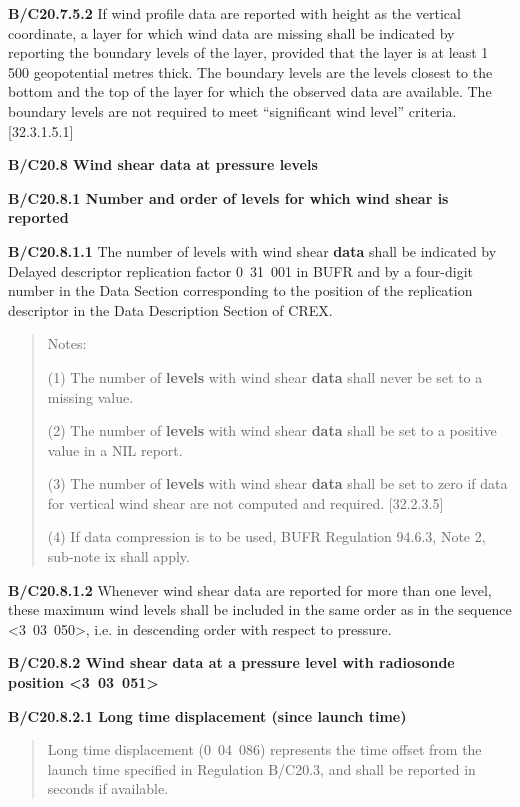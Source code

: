 \textbf{B/C20.7.5.2} If wind profile data are reported with height as the vertical coordinate, a layer for which wind data are missing shall be indicated by reporting the boundary levels of the layer, provided that the layer is at least 1 500 geopotential metres thick. The boundary levels are the levels closest to the bottom and the top of the layer for which the observed data are available. The boundary levels are not required to meet ``significant wind level'' criteria. {[}32.3.1.5.1{]}

\textbf{B/C20.8 Wind shear data at pressure levels}

\textbf{B/C20.8.1 Number and order of levels for which wind shear is reported}

\textbf{B/C20.8.1.1} The number of levels with wind shear \textbf{data} shall be indicated by Delayed descriptor replication factor 0~31~001 in BUFR and by a four-digit number in the Data Section corresponding to the position of the replication descriptor in the Data Description Section of CREX.

\begin{quote}
Notes:

(1) The number of \textbf{levels} with wind shear \textbf{data} shall never be set to a missing value.

(2) The number of \textbf{levels} with wind shear \textbf{data} shall be set to a positive value in a NIL report.

(3) The number of \textbf{levels} with wind shear \textbf{data} shall be set to zero if data for vertical wind shear are not computed and required. {[}32.2.3.5{]}

(4) If data compression is to be used, BUFR Regulation 94.6.3, Note 2, sub-note ix shall apply.
\end{quote}

\textbf{B/C20.8.1.2} Whenever wind shear data are reported for more than one level, these maximum wind levels shall be included in the same order as in the sequence \textless3~03~050\textgreater, i.e. in descending order with respect to pressure.

\textbf{B/C20.8.2 Wind shear data at a pressure level with radiosonde position \textless3~03~051\textgreater{}}

\textbf{B/C20.8.2.1 Long time displacement (since launch time)}

\begin{quote}
Long time displacement (0~04~086) represents the time offset from the launch time specified in Regulation B/C20.3, and shall be reported in seconds if available.
\end{quote}

